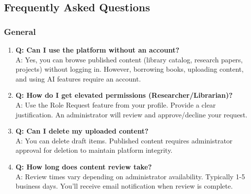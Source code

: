 \documentclass[12pt,a4paper]{article}
\begin{document}
\newpage

\subsection{Frequently Asked Questions}

\subsubsection{General}
\begin{enumerate}[leftmargin=*]
    \item \textbf{Q: Can I use the platform without an account?}\\
    A: Yes, you can browse published content (library catalog, research papers, projects) without logging in. However, borrowing books, uploading content, and using AI features require an account.
    
    \item \textbf{Q: How do I get elevated permissions (Researcher/Librarian)?}\\
    A: Use the Role Request feature from your profile. Provide a clear justification. An administrator will review and approve/decline your request.
    
    \item \textbf{Q: Can I delete my uploaded content?}\\
    A: You can delete draft items. Published content requires administrator approval for deletion to maintain platform integrity.
    
    \item \textbf{Q: How long does content review take?}\\
    A: Review times vary depending on administrator availability. Typically 1-5 business days. You'll receive email notification when review is complete.
\end{enumerate}
\end{document}
